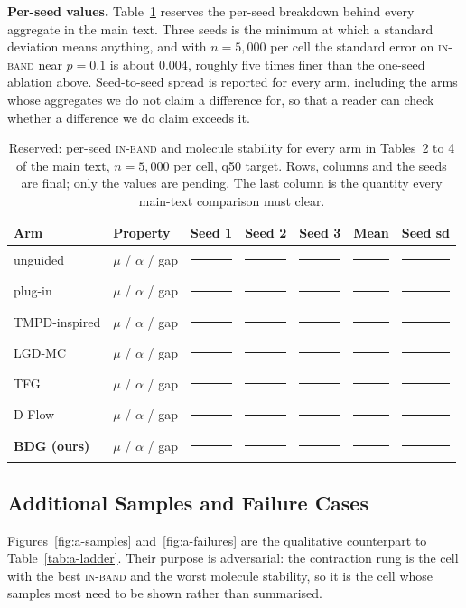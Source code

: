 \documentclass{article}
\newif\ifDRAFT \DRAFTtrue
\newcommand{\pend}{\ifDRAFT\textcolor{pendcol}{\rule[0.28ex]{1.15em}{0.6pt}}%
                   \else\phantom{0.0000}\fi}
\newcommand{\ib}{\textsc{in-band}}
\begin{document}
\textbf{Per-seed values.} Table~\ref{tab:a-seeds} reserves the per-seed breakdown
behind every aggregate in the main text. Three seeds is the minimum at which a
standard deviation means anything, and with $n{=}5{,}000$ per cell the standard
error on \ib{} near $p{=}0.1$ is about $0.004$, roughly five times finer than the
one-seed ablation above. Seed-to-seed spread is reported for every arm, including
the arms whose aggregates we do not claim a difference for, so that a reader can
check whether a difference we do claim exceeds it.

\begin{table}[h]
\centering\scriptsize
\caption{Reserved: per-seed \ib{} and molecule stability for every arm in
Tables~2 to 4 of the main text, $n{=}5{,}000$ per cell, q50 target. Rows, columns
and the seeds are final; only the values are pending. The last column is the
quantity every main-text comparison must clear.}
\label{tab:a-seeds}
\setlength{\tabcolsep}{5pt}
\begin{tabular}{llrrrrr}
\toprule
Arm & Property & Seed 1 & Seed 2 & Seed 3 & Mean & Seed sd \\
\midrule
unguided            & $\mu$ / $\alpha$ / gap & \pend & \pend & \pend & \pend & \pend \\
plug-in             & $\mu$ / $\alpha$ / gap & \pend & \pend & \pend & \pend & \pend \\
TMPD-inspired       & $\mu$ / $\alpha$ / gap & \pend & \pend & \pend & \pend & \pend \\
LGD-MC              & $\mu$ / $\alpha$ / gap & \pend & \pend & \pend & \pend & \pend \\
TFG                 & $\mu$ / $\alpha$ / gap & \pend & \pend & \pend & \pend & \pend \\
D-Flow              & $\mu$ / $\alpha$ / gap & \pend & \pend & \pend & \pend & \pend \\
\textbf{BDG (ours)} & $\mu$ / $\alpha$ / gap & \pend & \pend & \pend & \pend & \pend \\
\bottomrule
\end{tabular}
\end{table}

\subsection{Additional Samples and Failure Cases}
Figures~\ref{fig:a-samples} and~\ref{fig:a-failures} are the qualitative
counterpart to Table~\ref{tab:a-ladder}. Their purpose is adversarial: the contraction
rung is the cell with the best \ib{} and the worst molecule stability, so it is the
cell whose samples most need to be shown rather than summarised.
\end{document}
